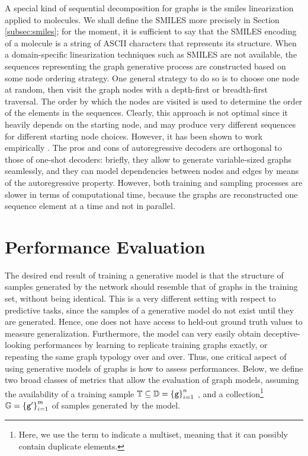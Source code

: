 A special kind of sequential decomposition for graphs is the \gls{smiles} linearization applied to molecules. We shall define the SMILES more precisely in Section \ref{subsec:smiles}; for the moment, it is sufficient to say that the SMILES encoding of a molecule is a string of ASCII characters that represents its structure. When a domain-specific linearization techniques such as SMILES are not available, the sequences representing the graph generative process are constructed based on some node ordering strategy. One general strategy to do so is to choose one node at random, then visit the graph nodes with a depth-first or breadth-first traversal. The order by which the nodes are visited is used to determine the order of the elements in the sequences. Clearly, this approach is not optimal since it heavily depends on the starting node, and may produce very different sequences for different starting node choices. However, it has been shown to work empirically \citep{you2018graphrnn,li2018learningdeepgmg,bacciu2019edgegraphgenrnn,goyal2020graphgen}. The pros and cons of autoregressive decoders are orthogonal to those of one-shot decoders: briefly, they allow to generate variable-sized graphs seamlessly, and they can model dependencies between nodes and edges by means of the autoregressive property. However, both training and sampling processes are slower in terms of computational time, because the graphs are reconstructed one sequence element at a time and not in parallel.

\section{Performance Evaluation}\label{sec:evaluation-generative-graphs}
The desired end result of training a generative model is that the structure of samples generated by the network should resemble that of graphs in the training set, without being identical. This is a very different setting with respect to predictive tasks, since the samples of a generative model do not exist until they are generated. Hence, one does not have access to held-out ground truth values to measure generalization. Furthermore, the model can very easily obtain deceptive-looking performances by learning to replicate training graphs exactly, or repeating the same graph typology over and over. Thus, one critical aspect of using generative models of graphs is how to assess performances. Below, we define two broad classes of metrics that allow the evaluation of graph models, assuming the availability of a training sample $\mathbb{T} \subseteq \mathbb{D} = \left\{ \mathtt{g} \right\}_{i=1}^n$ , and a collection\footnote{Here, we use the term  to indicate a multiset, meaning that it can possibly contain duplicate elements.} $\mathbb{G} = \left\{ \mathtt{g'} \right\}_{i=1}^m$ of samples generated by the model.

